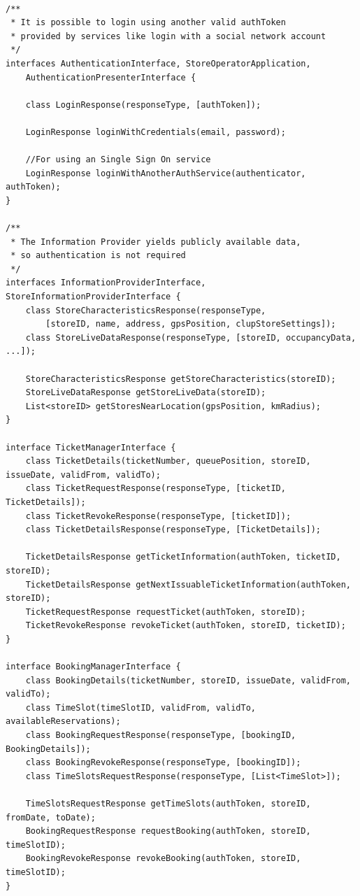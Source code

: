 \begin{lstlisting}

/**
 * It is possible to login using another valid authToken 
 * provided by services like login with a social network account 
 */
interfaces AuthenticationInterface, StoreOperatorApplication, 
    AuthenticationPresenterInterface {
                
    class LoginResponse(responseType, [authToken]);

    LoginResponse loginWithCredentials(email, password);

    //For using an Single Sign On service 
    LoginResponse loginWithAnotherAuthService(authenticator, authToken);
}

/**
 * The Information Provider yields publicly available data, 
 * so authentication is not required
 */
interfaces InformationProviderInterface, StoreInformationProviderInterface {
    class StoreCharacteristicsResponse(responseType, 
        [storeID, name, address, gpsPosition, clupStoreSettings]);
    class StoreLiveDataResponse(responseType, [storeID, occupancyData, ...]);

    StoreCharacteristicsResponse getStoreCharacteristics(storeID);
    StoreLiveDataResponse getStoreLiveData(storeID);
    List<storeID> getStoresNearLocation(gpsPosition, kmRadius);
}

interface TicketManagerInterface {
    class TicketDetails(ticketNumber, queuePosition, storeID, issueDate, validFrom, validTo);
    class TicketRequestResponse(responseType, [ticketID, TicketDetails]);
    class TicketRevokeResponse(responseType, [ticketID]);
    class TicketDetailsResponse(responseType, [TicketDetails]);

    TicketDetailsResponse getTicketInformation(authToken, ticketID, storeID);
    TicketDetailsResponse getNextIssuableTicketInformation(authToken, storeID);
    TicketRequestResponse requestTicket(authToken, storeID);
    TicketRevokeResponse revokeTicket(authToken, storeID, ticketID);
}

interface BookingManagerInterface {
    class BookingDetails(ticketNumber, storeID, issueDate, validFrom, validTo);
    class TimeSlot(timeSlotID, validFrom, validTo, availableReservations);
    class BookingRequestResponse(responseType, [bookingID, BookingDetails]);
    class BookingRevokeResponse(responseType, [bookingID]);
    class TimeSlotsRequestResponse(responseType, [List<TimeSlot>]);

    TimeSlotsRequestResponse getTimeSlots(authToken, storeID, fromDate, toDate);
    BookingRequestResponse requestBooking(authToken, storeID, timeSlotID);
    BookingRevokeResponse revokeBooking(authToken, storeID, timeSlotID);
}


\end{lstlisting}
